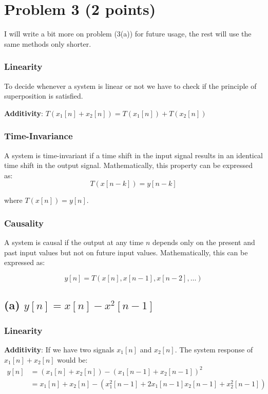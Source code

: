 \section{Problem 3 (2 points)}
I will write a bit more on problem (3(a)) for future usage, the rest will use the same methods only shorter.
\subsubsection*{Linearity}
To decide whenever a system is linear or not we have to check if the principle of superposition is satisfied.

\textbf{Additivity}: \( T(x_1[n] + x_2[n]) = T(x_1[n]) + T(x_2[n]) \)

\subsubsection*{Time-Invariance}

A system is time-invariant if a time shift in the input signal results in an identical time shift in the output signal. Mathematically, this property can be expressed as:
\begin{equation}
     T(x[n - k]) = y[n - k] 
\end{equation}


where \( T(x[n]) = y[n] \).

\subsubsection*{Causality}

A system is causal if the output at any time \( n \) depends only on the present and past input values but not on future input values. Mathematically, this can be expressed as:

\[ y[n] = T(x[n], x[n-1], x[n-2], \ldots) \]

\subsection*{(a) $y[n]=x[n]-x^2[n-1]$}

\subsubsection*{Linearity}

\textbf{Additivity}: If we have two signals $x_1[n]$ and $x_2[n]$. The system response of $x_1[n]+x_2[n]$ would be:
\begin{align}
    y[n] &= (x_{1}[n] + x_{2}[n]) - (x_{1}[n-1] + x_{2}[n-1])^{2} \\
    &= x_{1}[n] + x_{2}[n] - (x_{1}^{2}[n-1] + 2 x_{1}[n-1] x_{2}[n-1] + x_{2}^{2}[n-1])
\end{align}
    
